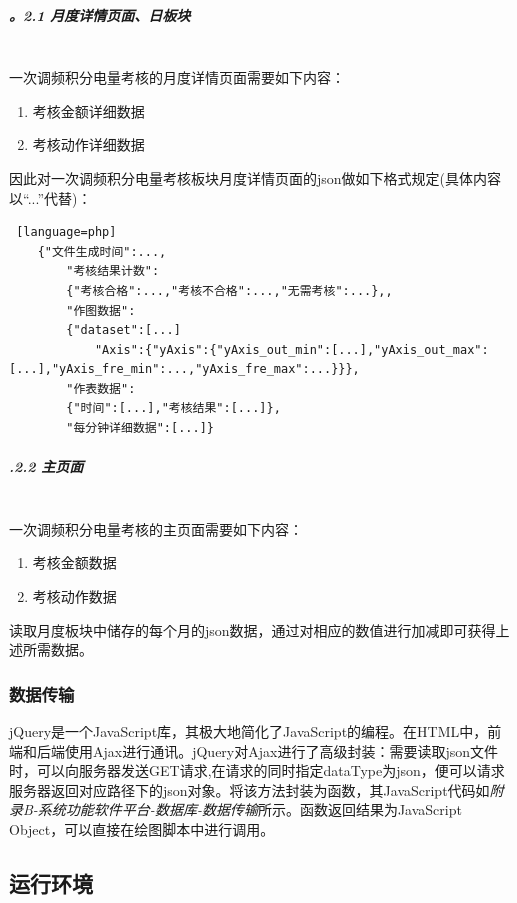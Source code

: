 \documentclass[winfonts,UTF8,a4paper]{ctexart}
\begin{document}
\subparagraph{\thesubsubsection。2.1 月度详情页面、日板块}\ \\
一次调频积分电量考核的月度详情页面需要如下内容：
\begin{enumerate}
	\item 考核金额详细数据
	\item 考核动作详细数据
\end{enumerate}

因此对一次调频积分电量考核板块月度详情页面的json做如下格式规定(具体内容以“...”代替)：

\begin{lstlisting} [language=php]
	{"文件生成时间":...,
		"考核结果计数":
		{"考核合格":...,"考核不合格":...,"无需考核":...},,
		"作图数据":
		{"dataset":[...]
			"Axis":{"yAxis":{"yAxis_out_min":[...],"yAxis_out_max":[...],"yAxis_fre_min":...,"yAxis_fre_max":...}}},
		"作表数据":
		{"时间":[...],"考核结果":[...]},
		"每分钟详细数据":[...]}
\end{lstlisting}

\subparagraph{\thesubsubsection.2.2 主页面}\ \\
一次调频积分电量考核的主页面需要如下内容：
\begin{enumerate}
	\item 考核金额数据
	\item 考核动作数据
\end{enumerate}

读取月度板块中储存的每个月的json数据，通过对相应的数值进行加减即可获得上述所需数据。

\subsubsection{数据传输}


jQuery是一个JavaScript库，其极大地简化了JavaScript的编程。在HTML中，前端和后端使用Ajax进行通讯。jQuery对Ajax进行了高级封装：需要读取json文件时，可以向服务器发送GET请求,在请求的同时指定dataType为json，便可以请求服务器返回对应路径下的json对象。将该方法封装为函数，其JavaScript代码如\textit{附录B-系统功能软件平台-数据库-数据传输}所示。函数返回结果为JavaScript Object，可以直接在绘图脚本中进行调用。

\subsection{运行环境}
\end{document}
